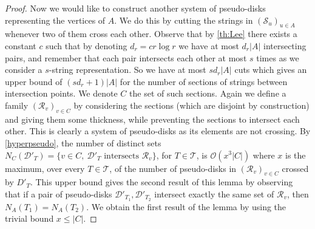 \documentclass{amsart}
\newcommand{\D}{\mathcal{D}} \newcommand{\R}{\mathcal{R}} \newcommand{\C}{\mathcal{C}} \newcommand{\E}{\mathcal{E}}
\newcommand{\mR}{{\mathcal{R}}}
\newcommand{\mT}{\mathcal{T}}
\renewcommand{\O}{\mathcal{O}}
\begin{document}
\begin{proof}
Now we would like to construct another system of pseudo-disks representing the vertices of $A$. We do this by cutting the strings in $(\mathcal S_u)_{u\in A}$ whenever two of them cross each other. Observe that by \autoref{th:Lee} there exists a constant $c$ such that by denoting $d_r=cr\log r$ we have at most $d_r |A|$ intersecting pairs, and remember that each pair intersects each other at most $s$ times as we consider a $s$-string representation. So we have at most $sd_r |A|$ cuts which gives an upper bound of $(sd_r+1)|A|$ for the number of sections of strings between intersection points. We denote $C$ the set of such sections. Again we define a family $(\mathcal R_v)_{v\in C}$ by considering the sections (which are disjoint by construction) and giving them some thickness, while preventing the sections to intersect each other. This is clearly a system of pseudo-disks as its elements are not crossing. By \autoref{hyperpseudo}, the number of distinct sets  $N_C(\mathcal D'_T) = \{v\in C,~{\mathcal D'_T} \text{ intersects } {\mathcal{R}_v}\}$, for $T\in \mT$,
is $\O(x^3|C|)$ where $x$ is the maximum, over every  $T\in \mT$, of the number of pseudo-disks in $(\mathcal R_v)_{v\in C}$ crossed by $D'_T$. This upper bound gives the second result of this lemma by observing that if a pair of pseudo-disks $\D'_{T_1},\D'_{T_2}$ intersect exactly the same set of $\mR_v$, then $N_A(T_1)=N_A(T_2)$. We obtain the first result of the lemma by using the trivial bound $x\leq |C|$.
\end{proof}
\end{document}
